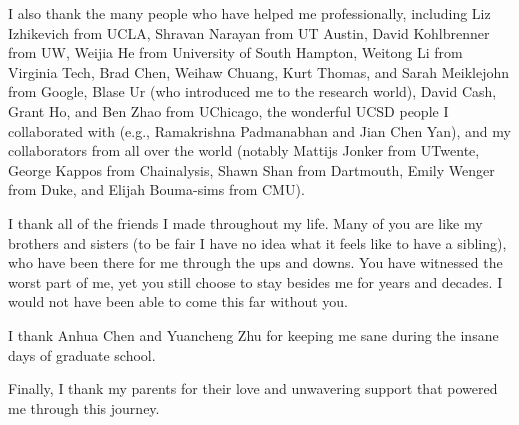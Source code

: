 \begin{acknowledgements}
I also thank the many people who have helped me professionally, including Liz Izhikevich from UCLA, Shravan Narayan from UT Austin, David Kohlbrenner from UW, Weijia He from University of South Hampton, Weitong Li from Virginia Tech, Brad Chen, Weihaw Chuang, Kurt Thomas, and Sarah Meiklejohn from Google, Blase Ur (who introduced me to the research world), David Cash, Grant Ho, and Ben Zhao from UChicago, the wonderful UCSD people I collaborated with (e.g., Ramakrishna Padmanabhan and Jian Chen Yan), and my collaborators from all over the world (notably Mattijs Jonker from UTwente, George Kappos from Chainalysis, Shawn Shan from Dartmouth, Emily Wenger from Duke, and Elijah Bouma-sims from CMU).

I thank all of the friends I made throughout my life. Many of you are like my brothers and sisters (to be fair I have no idea what it feels like to have a sibling), who have been there for me through the ups and downs. You have witnessed the worst part of me, yet you still choose to stay besides me for years and decades. I would not have been able to come this far without you. 

I thank Anhua Chen and Yuancheng Zhu for keeping me sane during the insane days of graduate school.

Finally, I thank my parents for their love and unwavering support that powered me through this journey.



\end{acknowledgements}
